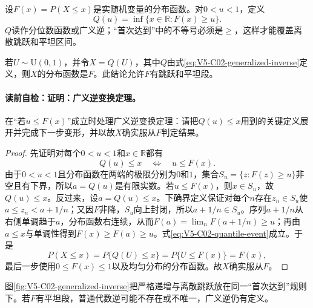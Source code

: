 \begin{definition}[分布函数的广义逆]
设$F(x)=P(X\le x)$是实随机变量的分布函数。对$0<u<1$，定义
\begin{equation}\label{eq:V5-C02-generalized-inverse}
Q(u)=\inf\{x\in\mathbb R:F(x)\ge u\}.
\end{equation}
$Q$读作分位数函数或广义逆；“首次达到”中的不等号必须是$\ge$，这样才能覆盖离散跳跃和平坦区间。
\end{definition}

\begin{theorem}[广义逆变换定理]\label{thm:V5-C02-inverse-transform}
若$U\sim\mathrm U(0,1)$，并令$X=Q(U)$，其中$Q$由式\eqref{eq:V5-C02-generalized-inverse}定义，则$X$的分布函数是$F$。此结论允许$F$有跳跃和平坦段。
\end{theorem}
\paragraph{读前自检：证明：广义逆变换定理。}在“若$u\le F(x)$”成立时处理广义逆变换定理：请把$Q(u)\le x$用到的关键定义展开并完成下一步变形，并以故$X$确实服从$F$判定结果。\par

\begin{proof}
先证明对每个$0<u<1$和$x\in\mathbb R$都有
\begin{equation}\label{eq:V5-C02-quantile-event}
Q(u)\le x\quad\Longleftrightarrow\quad u\le F(x).
\end{equation}
由于$0<u<1$且分布函数在两端的极限分别为$0$和$1$，集合$S_u=\{z:F(z)\ge u\}$非空且有下界，所以$a=Q(u)$是有限实数。若$u\le F(x)$，则$x\in S_u$，故$Q(u)\le x$。反过来，设$a=Q(u)\le x$。下确界定义保证对每个$n$存在$z_n\in S_u$使$a\le z_n<a+1/n$；又因$F$非降，$S_u$向上封闭，所以$a+1/n\in S_u$。序列$a+1/n$从右侧单调趋于$a$，分布函数右连续，从而$F(a)=\lim_nF(a+1/n)\ge u$；再由$a\le x$与单调性得到$F(x)\ge F(a)\ge u$。式\eqref{eq:V5-C02-quantile-event}成立。于是
\[
P(X\le x)=P\{Q(U)\le x\}=P\{U\le F(x)\}=F(x),
\]
最后一步使用$0\le F(x)\le1$以及均匀分布的分布函数。故$X$确实服从$F$。
\end{proof}
图\ref{fig:V5-C02-generalized-inverse}把严格递增与离散跳跃放在同一“首次达到”规则下。若$F$有平坦段，普通代数逆可能不存在或不唯一，广义逆仍有定义。


